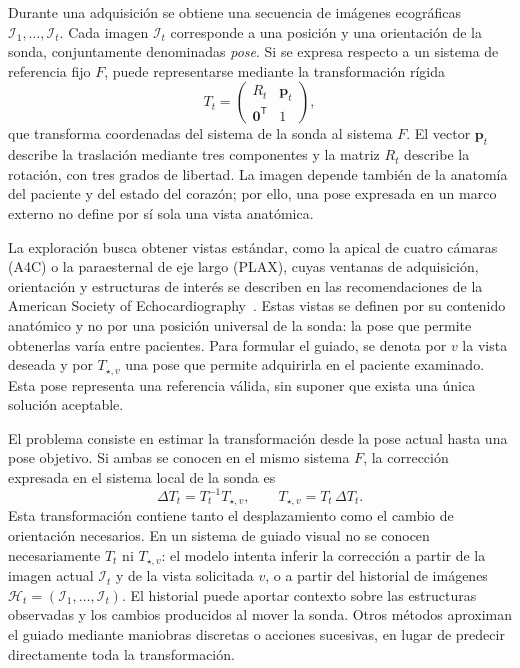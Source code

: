 \documentclass[10pt,a4paper]{article}
\begin{document}
Durante una adquisición se obtiene una secuencia de imágenes ecográficas $\mathcal{I}_1,\ldots,\mathcal{I}_t$. Cada imagen $\mathcal{I}_t$ corresponde a una posición y una orientación de la sonda, conjuntamente denominadas \textit{pose}. Si se expresa respecto a un sistema de referencia fijo $F$, puede representarse mediante la transformación rígida
\begin{equation}
  T_t=\begin{pmatrix}R_t & \mathbf{p}_t\\ \mathbf{0}^{\mathsf T} & 1\end{pmatrix},
  \label{eq:guiado_pose}
\end{equation}
que transforma coordenadas del sistema de la sonda al sistema $F$. El vector $\mathbf{p}_t$ describe la traslación mediante tres componentes y la matriz $R_t$ describe la rotación, con tres grados de libertad. La imagen depende también de la anatomía del paciente y del estado del corazón; por ello, una pose expresada en un marco externo no define por sí sola una vista anatómica.

La exploración busca obtener vistas estándar, como la apical de cuatro cámaras (A4C) o la paraesternal de eje largo (PLAX), cuyas ventanas de adquisición, orientación y estructuras de interés se describen en las recomendaciones de la American Society of Echocardiography~\cite{Mitchell2019TTE}. Estas vistas se definen por su contenido anatómico y no por una posición universal de la sonda: la pose que permite obtenerlas varía entre pacientes. Para formular el guiado, se denota por $v$ la vista deseada y por $T_{\star,v}$ una pose que permite adquirirla en el paciente examinado. Esta pose representa una referencia válida, sin suponer que exista una única solución aceptable.

El problema consiste en estimar la transformación desde la pose actual hasta una pose objetivo. Si ambas se conocen en el mismo sistema $F$, la corrección expresada en el sistema local de la sonda es
\begin{equation}
  \Delta T_t=T_t^{-1}T_{\star,v},
  \qquad T_{\star,v}=T_t\,\Delta T_t.
  \label{eq:guiado_correccion}
\end{equation}
Esta transformación contiene tanto el desplazamiento como el cambio de orientación necesarios. En un sistema de guiado visual no se conocen necesariamente $T_t$ ni $T_{\star,v}$: el modelo intenta inferir la corrección a partir de la imagen actual $\mathcal{I}_t$ y de la vista solicitada $v$, o a partir del historial de imágenes $\mathcal{H}_t=(\mathcal{I}_1,\ldots,\mathcal{I}_t)$. El historial puede aportar contexto sobre las estructuras observadas y los cambios producidos al mover la sonda. Otros métodos aproximan el guiado mediante maniobras discretas o acciones sucesivas, en lugar de predecir directamente toda la transformación.
\end{document}
